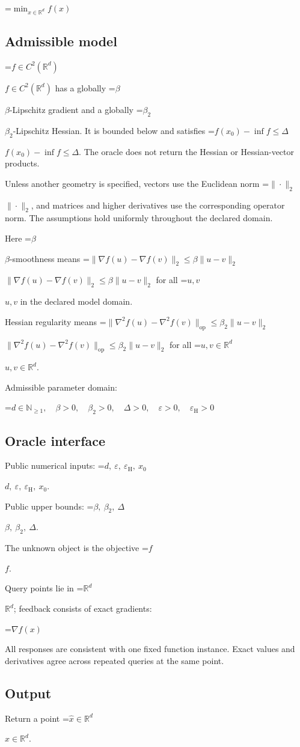 \documentclass[10pt,a4paper]{article}
\newcommand{\AtlasMath}[1]{\par\begingroup\centering\setbox0=\hbox{$\displaystyle #1$}\ifdim\wd0>1.4\linewidth\typeout{ATLAS WIDE FORMULA: \the\wd0}\fi\ifdim\wd0>\linewidth\resizebox{\linewidth}{!}{\box0}\else\box0\fi\par\endgroup}
\newcommand{\AtlasInlineMath}[1]{\begingroup\setbox0=\hbox{$#1$}\ifdim\wd0>.4\linewidth\endgroup\AtlasMath{#1}\else\endgroup$#1$\fi}
\begin{document}
\AtlasMath{\min_{x\in \mathbb{R}^d}f(x)}


\subsection{Admissible model}
\AtlasInlineMath{f\in C^2(\mathbb R^d)} has a globally \AtlasInlineMath{\beta}-Lipschitz gradient and a globally \AtlasInlineMath{\beta_2}-Lipschitz Hessian. It is bounded below and satisfies \AtlasInlineMath{f(x_0)-\inf f\le\Delta}. The oracle does not return the Hessian or Hessian-vector products.

Unless another geometry is specified, vectors use the Euclidean norm \AtlasInlineMath{\|\cdot\|_2}, and matrices and higher derivatives use the corresponding operator norm. The assumptions hold uniformly throughout the declared domain.

Here \AtlasInlineMath{\beta}-smoothness means \AtlasInlineMath{\|\nabla f(u)-\nabla f(v)\|_2\le\beta\|u-v\|_2} for all \AtlasInlineMath{u,v} in the declared model domain.

Hessian regularity means \AtlasInlineMath{\|\nabla^2 f(u)-\nabla^2 f(v)\|_{\mathrm{op}}\le\beta_2\|u-v\|_2} for all \AtlasInlineMath{u,v\in\mathbb R^d}.

Admissible parameter domain:


\AtlasMath{d\in\mathbb{N}_{\ge1},\quad \beta>0,\quad \beta_2>0,\quad \Delta>0,\quad \varepsilon>0,\quad \varepsilon_{\mathrm{H}}>0}


\subsection{Oracle interface}
Public numerical inputs: \AtlasInlineMath{d,\ \varepsilon,\ \varepsilon_{\mathrm{H}},\ x_0}.

Public upper bounds: \AtlasInlineMath{\beta,\ \beta_2,\ \Delta}.

The unknown object is the objective \AtlasInlineMath{f}.

Query points lie in \AtlasInlineMath{\mathbb{R}^d}; feedback consists of exact gradients:


\AtlasMath{\nabla f(x)}


All responses are consistent with one fixed function instance. Exact values and derivatives agree across repeated queries at the same point.

\subsection{Output}
Return a point \AtlasInlineMath{\widehat x\in\mathbb R^d}.
\end{document}
